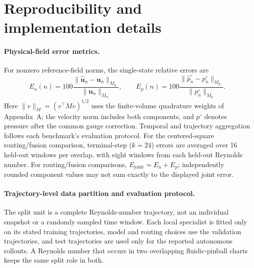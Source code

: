 \section{Reproducibility and implementation details}
\label{app:implementation}

\paragraph{Physical-field error metrics.}
For nonzero reference-field norms, the single-state relative errors are
\begin{equation}
E_u(n)=100\frac{\|\widehat{\mathbf u}_n-\mathbf u_n\|_{M_u}}
{\|\mathbf u_n\|_{M_u}},\qquad
E_p(n)=100\frac{\|\widehat p_n^\circ-p_n^\circ\|_{M_p}}
{\|p_n^\circ\|_{M_p}}.
\label{eq:field_errors}
\end{equation}
Here $\|v\|_M=(v^\top Mv)^{1/2}$ uses the finite-volume quadrature
weights of Appendix~A; the velocity norm includes both components, and
$p^\circ$ denotes pressure after the common gauge correction.
Temporal and trajectory aggregation follows each benchmark's evaluation
protocol. For the centered-square routing/fusion comparison, terminal-step
($k=24$) errors are averaged over 16 held-out windows per overlap, with eight
windows from each held-out Reynolds number.
For routing/fusion comparisons, $E_{\mathrm{joint}}=E_u+E_p$; independently
rounded component values may not sum exactly to the displayed joint error.

\paragraph{Trajectory-level data partition and evaluation protocol.}
The split unit is a complete Reynolds-number trajectory, not an individual snapshot or a randomly sampled time window. Each local specialist is fitted only on its stated training trajectories, model and routing choices use the validation trajectories, and test trajectories are used only for the reported autonomous rollouts. A Reynolds number that occurs in two overlapping fluidic-pinball charts keeps the same split role in both.

